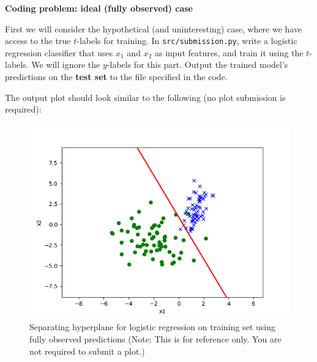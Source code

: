 \item {} \textbf{Coding problem: ideal (fully observed) case}

First we will consider the hypothetical (and uninteresting) case, where we have access to the true
$t$-labels for training. In \texttt{src/submission.py}, write a logistic
regression classifier that uses $x_1$ and $x_2$ as input features, and train it
using the $t$-labels. We will ignore the $y$-labels for this part. Output the
trained model's predictions on the \textbf{test set} to the file specified in the code.

The output plot should look similar to the following (no plot submission is required):
\begin{figure}[H]
	\centering
	\vspace{2mm}
	\includegraphics[width=0.5\linewidth]{02-posonly/posonly_true_pred.png}
    \caption{Separating hyperplane for logistic regression on training set using fully observed predictions (Note: This is for reference only.  You are not required to submit a plot.)}
\end{figure}